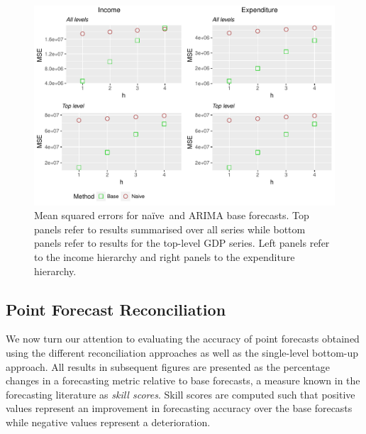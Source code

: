 \documentclass[graybox]{svmult}
\def\naive{na\"{i}ve\ }
\begin{document}
\begin{figure}
	\centering
	\small
	\includegraphics[width=\textwidth]{Figs/Results/NaiveVsBase_MSE.pdf}
	\caption{Mean squared errors for \naive and ARIMA base forecasts. Top panels refer to results summarised over all series while bottom panels refer to results for the top-level GDP series. Left panels refer to the income hierarchy and right panels to the expenditure hierarchy.}\label{fig: NaiveVsBase_MSE}
\end{figure}


\subsection{Point Forecast Reconciliation}

We now turn our attention to evaluating the accuracy of point forecasts obtained using the different reconciliation approaches as well as the single-level bottom-up approach. All results in subsequent figures are presented as the percentage changes in a forecasting metric relative to base forecasts, a measure known in the forecasting literature as \emph{skill scores}. Skill scores are computed such that positive values represent an improvement in forecasting accuracy over the base forecasts while negative values represent a deterioration.
\end{document}
